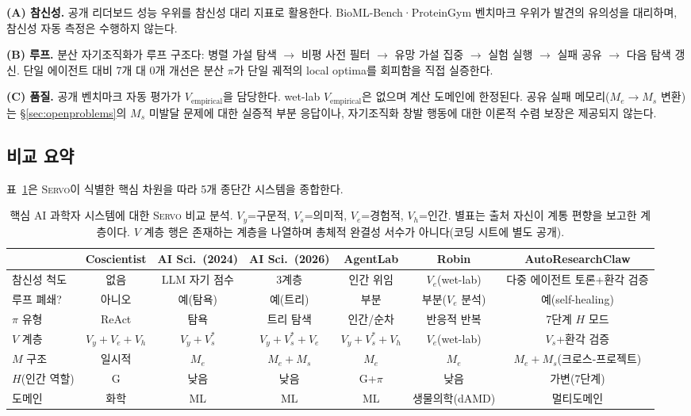 \documentclass[11pt]{article}
\newcommand{\framework}{\textsc{Servo}}
\begin{document}
\noindent\textbf{(A) 참신성.} 공개 리더보드 성능 우위를 참신성 대리 지표로 활용한다. BioML-Bench·ProteinGym 벤치마크 우위가 발견의 유의성을 대리하며, 참신성 자동 측정은 수행하지 않는다.

\noindent\textbf{(B) 루프.} 분산 자기조직화가 루프 구조다: 병렬 가설 탐색 $\to$ 비평 사전 필터 $\to$ 유망 가설 집중 $\to$ 실험 실행 $\to$ 실패 공유 $\to$ 다음 탐색 갱신. 단일 에이전트 대비 7개 대 0개 개선은 분산 $\pi$가 단일 궤적의 local optima를 회피함을 직접 실증한다.

\noindent\textbf{(C) 품질.} 공개 벤치마크 자동 평가가 $V_\text{empirical}$을 담당한다. wet-lab $V_\text{empirical}$은 없으며 계산 도메인에 한정된다. 공유 실패 메모리($M_e \to M_s$ 변환)는 §\ref{sec:openproblems}의 $M_s$ 미발달 문제에 대한 실증적 부분 응답이나, 자기조직화 창발 행동에 대한 이론적 수렴 보장은 제공되지 않는다.

\subsection{비교 요약}
\label{sec:core-summary}

표~\ref{tab:core-comparison}은 \framework{}이 식별한 핵심 차원을 따라 5개 종단간 시스템을 종합한다.

\begin{table}[h]
\centering
\small
\setlength{\tabcolsep}{3pt}
\begin{tabular}{@{}lcccccc@{}}
\toprule
& \textbf{Coscientist} & \textbf{AI Sci.\ (2024)} & \textbf{AI Sci.\ (2026)} & \textbf{AgentLab} & \textbf{Robin} & \textbf{AutoResearchClaw} \\
\midrule
참신성 척도   & 없음         & LLM 자기 점수 & 3계층         & 인간 위임     & $V_e$(wet-lab) & 다중 에이전트 토론+환각 검증 \\
루프 폐쇄?      & 아니오       & 예(탐욕)      & 예(트리)      & 부분          & 부분($V_e$ 분석) & 예(self-healing) \\
$\pi$ 유형        & ReAct        & 탐욕          & 트리 탐색     & 인간/순차     & 반응적 반복     & 7단계 $H$ 모드 \\
$V$ 계층      & $V_y{+}V_e{+}V_h$ & $V_y{+}V_s^{*}$ & $V_y{+}V_s^{*}{+}V_e$ & $V_y{+}V_s^{*}{+}V_h$ & $V_e$(wet-lab) & $V_s$+환각 검증 \\
$M$ 구조     & 일시적     & $M_e$          & $M_e+M_s$       & $M_e$          & $M_e$            & $M_e+M_s$(크로스-프로젝트) \\
$H$(인간 역할)  & G           & 낮음           & 낮음            & G+$\pi$        & 낮음             & 가변(7단계) \\
도메인      & 화학         & ML             & ML              & ML             & 생물의학(dAMD)  & 멀티도메인 \\
\bottomrule
\end{tabular}
\caption{핵심 AI 과학자 시스템에 대한 \framework{} 비교 분석. $V_y$=구문적, $V_s$=의미적, $V_e$=경험적, $V_h$=인간. 별표는 출처 자신이 계통 편향을 보고한 계층이다. $V$ 계층 행은 존재하는 계층을 나열하며 총체적 완결성 서수가 아니다(코딩 시트에 별도 공개).}
\label{tab:core-comparison}
\end{table}
\end{document}
